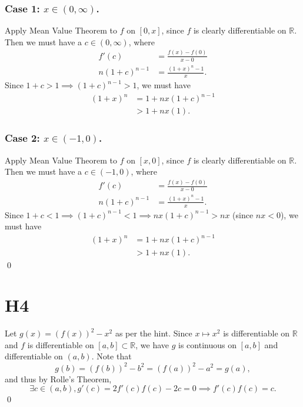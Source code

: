 \documentclass{article}
\theoremstyle{plain}
\newcommand{\R}{\mathbb{R}}
\begin{document}
\subsubsection*{Case 1: $x\in(0,\infty)$.}
Apply Mean Value Theorem to $f$ on $[0,x]$, since $f$ is clearly differentiable
on $\R$. Then we must have a $c\in(0,\infty)$, where
\begin{align*}
  f'(c) &=\frac{f(x)-f(0)}{x-0}\\
  n(1+c)^{n-1}&=\frac{(1+x)^{n}-1}{x}.
\end{align*}
Since $1+c>1\implies(1+c)^{n-1}>1$, we must have
\begin{align*}
  (1+x)^{n} &= 1 + nx(1+c)^{n-1}\\
  &> 1+ nx(1).
\end{align*}
\subsubsection*{Case 2: $x\in(-1, 0)$.}
Apply Mean Value Theorem to $f$ on $[x,0]$, since $f$ is clearly differentiable
on $\R$. Then we must have a $c\in(-1,0)$, where
\begin{align*}
  f'(c) &=\frac{f(x)-f(0)}{x-0}\\
  n(1+c)^{n-1}&=\frac{(1+x)^{n}-1}{x}.
\end{align*}
Since $1+c<1\implies(1+c)^{n-1}<1\implies nx(1+c)^{n-1}>nx$ (since $nx < 0$), we must have
\begin{align*}
  (1+x)^{n} &= 1 + nx(1+c)^{n-1}\\
  &> 1+ nx(1).
\end{align*}\qed

\section*{H4}
Let $g(x)=(f(x))^{2}-x^{2}$ as per the hint. Since $x\mapsto x^{2}$ is differentiable
on $\R$ and $f$ is differentiable on $[a,b]\subset\R$, we have $g$ is continuous on
$[a,b]$ and differentiable on $(a,b)$. Note that
\[g(b)=(f(b))^{2}-b^{2}=(f(a))^{2}-a^{2}=g(a),\] and thus by Rolle's Theorem,
\[\exists c\in(a,b), g'(c)=
  2f'(c)f(c)-2c =0 \implies
f'(c)f(c)=c.\]\qed
\end{document}
